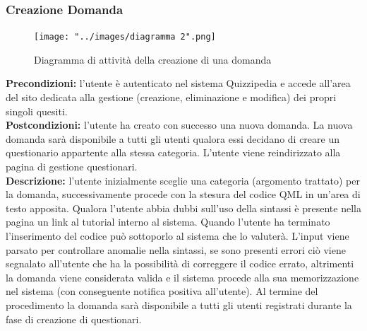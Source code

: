 \documentclass[a4paper,11pt]{article}
\begin{document}
\subsubsection{Creazione Domanda}
\begin{figure}[h!]
\begin{center}
	\centerline{\texttt{[image: "../images/diagramma 2".png]}}
	\caption{Diagramma di attività della creazione di una domanda}
\end{center}
\end{figure}
\textbf{Precondizioni:} l'utente è autenticato nel sistema Quizzipedia e accede all'area del sito dedicata alla gestione (creazione, eliminazione e modifica) dei propri singoli quesiti.\\
\textbf{Postcondizioni:} l'utente ha creato con successo una nuova domanda. La nuova domanda sarà disponibile a tutti gli utenti qualora essi decidano di creare un questionario appartente alla stessa categoria. L'utente viene reindirizzato alla pagina di gestione questionari.\\ %
\textbf{Descrizione:} l'utente inizialmente sceglie una categoria (argomento trattato) per la domanda, successivamente procede con la stesura del codice QML in un'area di testo apposita. Qualora l'utente abbia dubbi sull'uso della sintassi è presente nella pagina un link al tutorial interno al sistema. Quando l'utente ha terminato l'inserimento del codice può sottoporlo al sistema che lo valuterà. L'input viene parsato per controllare anomalie nella sintassi, se sono presenti errori ciò viene segnalato all'utente che ha la possibilità di correggere il codice errato, altrimenti la domanda viene considerata valida e il sistema procede alla sua memorizzazione nel sistema (con conseguente notifica positiva all'utente). Al termine del procedimento la domanda sarà disponibile a tutti gli utenti registrati durante la fase di creazione di questionari.\\
\newpage
\end{document}
